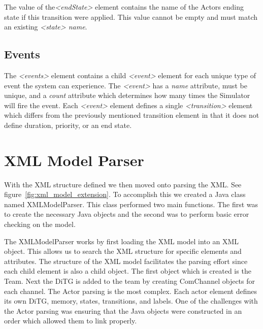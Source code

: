 The value of the{\em \textless endState\textgreater} element contains the name of the Actors ending state if this transition were applied.  This value cannot be empty and must match an existing {\em \textless state> name}.

\begin{spacing}{.5}

\end{spacing}


\subsection{Events}

The {\em \textless events\textgreater} element contains a child {\em \textless event\textgreater} element for each unique type of event the system can experience.  The {\em \textless event\textgreater} has a {\em name} attribute, must be unique, and a {\em count} attribute which determines how many times the Simulator will fire the event.  Each {\em \textless event\textgreater} element defines a single {\em \textless transition\textgreater} element which differs from the previously mentioned transition element in that it does not define duration, priority, or an end state.

\begin{spacing}{.5}

\end{spacing}

\section{XML Model Parser}

With the XML structure defined we then moved onto parsing the XML.  See figure~\ref{fig:xml_model_extension}.  To accomplish this we created a Java class named XMLModelParser.  This class performed two main functions.  The first was to create the necessary Java objects and the second was to perform basic error checking on the model.  

The XMLModelParser works by first loading the XML model into an XML object.  This allows us to search the XML structure for specific elements and attributes.  The structure of the XML model facilitates the parsing effort since each child element is also a child object.  The first object which is created is the Team.  Next the DiTG is added to the team by creating ComChannel objects for each channel.  The Actor parsing is the most complex.  Each actor element defines its own DiTG, memory, states, transitions, and labels.  One of the challenges with the Actor parsing was ensuring that the Java objects were constructed in an order which allowed them to link properly.

